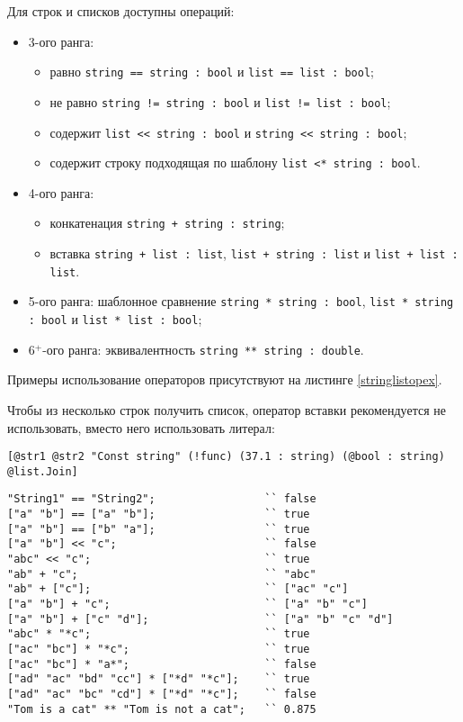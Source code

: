 \documentclass[a4paper, 14pt]{extarticle}
\newenvironment{icItems}
	{ \begin{itemize} [noitemsep,nolistsep] }
	{ \end{itemize} }
\begin{document}
	Для строк и списков доступны операций:
\begin{icItems}
	\item
		3-ого ранга:
		\begin{icItems}
		\item
			равно \lstinline`string == string : bool` и \lstinline`list == list : bool`;
		\item
			не равно \lstinline`string != string : bool` и \lstinline`list != list : bool`;
		\item
			содержит \lstinline`list << string : bool` и \lstinline`string << string : bool`;
		\item
			содержит строку подходящая по шаблону \lstinline`list <* string : bool`.
		\end{icItems}
	\item
		4-ого ранга:
		\begin{icItems}
		\item
			конкатенация \lstinline`string + string : string`;
		\item
			вставка \lstinline`string + list : list`, \lstinline`list + string : list` и \lstinline`list + list : list`.
		\end{icItems}
	\item
		5-ого ранга: шаблонное сравнение \lstinline`string * string : bool`, \lstinline`list * string : bool` и \lstinline`list * list : bool`;
	\item
		6$^+$-ого ранга: эквивалентность \lstinline`string ** string : double`.
\end{icItems}

Примеры использование операторов присутствуют на листинге \ref{stringlistopex}.

Чтобы из несколько строк получить список, оператор вставки рекомендуется не использовать, вместо него использовать литерал:
\begin{lstlisting}[numbers=none]
[@str1 @str2 "Const string" (!func) (37.1 : string) (@bool : string) @list.Join]
\end{lstlisting}

\begin{lstlisting}[caption=Примеры использования операторов над данными типа string и list, label=stringlistopex]
"String1" == "String2";					`` false
["a" "b"] == ["a" "b"];					`` true
["a" "b"] == ["b" "a"];					`` true
["a" "b"] << "c";						`` false
"abc" << "c";							`` true
"ab" + "c";								`` "abc"
"ab" + ["c"];							`` ["ac" "c"]
["a" "b"] + "c";						`` ["a" "b" "c"]
["a" "b"] + ["c" "d"];					`` ["a" "b" "c" "d"]
"abc" * "*c";							`` true
["ac" "bc"] * "*c";						`` true
["ac" "bc"] * "a*";						`` false
["ad" "ac" "bd" "cc"] * ["*d" "*c"];	`` true
["ad" "ac" "bc" "cd"] * ["*d" "*c"];	`` false
"Tom is a cat" ** "Tom is not a cat";	`` 0.875
\end{lstlisting}
\end{document}
